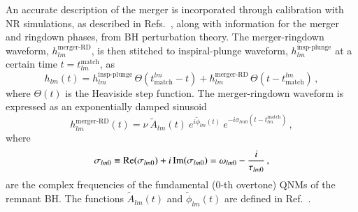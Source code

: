 \documentclass[twocolumn,
               prd,
               aps,
               superscriptaddress,
               tightenlines,
               nofootinbib,
               eqsecnum,
               amsfonts,
               amsmath,
               longbibliography]{revtex4-1}
\newcommand{\ag}[1]{{\textcolor{Maroon}{{#1}}}}
\begin{document}
An accurate description of the merger is incorporated through calibration with
NR simulations, as described in Refs.~\cite{Bohe:2016gbl,Cotesta:2018fcv}, along with
information for the merger and ringdown phases, from BH perturbation theory.
The merger-ringdown waveform, $h_{l m}^\textrm{merger-RD}$, is then stitched to
inspiral-plunge waveform, $h_{l m}^\textrm{insp-plunge}$ at a certain time $t = t^{\textrm{match}}_{l m}$, as
%
\begin{equation}
h_{l m}(t) =
h_{l m}^\textrm{insp-plunge}\, \Theta(t_\textrm{match}^{l m} - t)
+ h_{l m}^\textrm{merger-RD}\,\Theta(t-t_\textrm{match}^{l m})\,,
\end{equation}
%
where $\Theta(t)$ is the Heaviside step function.
%
The merger-ringdown waveform is expressed as an exponentially damped
sinusoid~\cite{Bohe:2016gbl,Cotesta:2018fcv}
%
\begin{equation}
\label{RD}
h_{l m}^{\textrm{merger-RD}}(t) = \nu \ \tilde{A}_{l m}(t)\ e^{i \tilde{\phi}_{l m}(t)} \ e^{-i \sigma_{l m 0}(t-t^{\textrm{match}}_{l m})}\,,
\end{equation}
%
where
%
\begin{align}
\sigma_{l m 0} \equiv {\rm Re}(\sigma_{l m 0}) + i \, {\rm Im}(\sigma_{l m 0})
= \omega_{l m 0} - \frac{i}{\tau_{l m 0}}\,,
\end{align}
%
are the complex frequencies of the fundamental ($0$-th overtone) QNMs of the remnant BH.
%
%
The functions $\tilde{A}_{l m}(t)$ and $\tilde{\phi}_{l m}(t)$ are defined
in Ref.~\cite{Bohe:2016gbl,Cotesta:2018fcv}.
\end{document}
